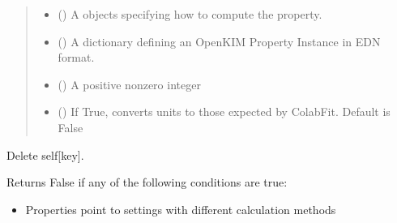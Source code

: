 \documentclass[letterpaper,10pt,english]{sphinxmanual}
\begin{document}
\begin{fulllineitems}
\begin{quote}
\begin{description}
\begin{itemize}
\item {} 
\sphinxAtStartPar
{} ({\hyperref[\detokenize{property_settings:colabfit.tools.property_settings.PropertySettings}]{}}) \textendash{} A  objects specifying how to
compute the property.

\item {} 
\sphinxAtStartPar
{} () \textendash{} A dictionary defining an OpenKIM Property Instance in EDN format.

\item {} 
\sphinxAtStartPar
{} () \textendash{} A positive non\sphinxhyphen{}zero integer

\item {} 
\sphinxAtStartPar
{} () \textendash{} If True, converts units to those expected by ColabFit. Default
is False

\end{itemize}

\end{description}\end{quote}

\begin{fulllineitems}
\label{\detokenize{property:colabfit.tools.property.Property.__delitem__}}
\sphinxAtStartPar
Delete self{[}key{]}.

\end{fulllineitems}


\begin{fulllineitems}
\label{\detokenize{property:colabfit.tools.property.Property.__eq__}}
\sphinxAtStartPar
Returns False if any of the following conditions are true:
\begin{itemize}
\item {} 
\sphinxAtStartPar
Properties point to settings with different calculation methods


\end{itemize}
\end{fulllineitems}
\end{fulllineitems}
\end{document}
